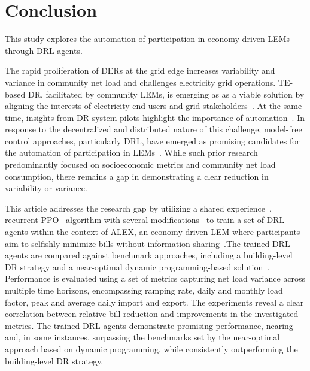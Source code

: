 \documentclass[preprint, 12pt]{elsarticle}
\begin{document}
\section{Conclusion}\label{sec: Conclusion}
This study explores the automation of participation in economy-driven LEMs through DRL agents.

The rapid proliferation of DERs at the grid edge increases variability and variance in community net load and challenges electricity grid operations. TE-based DR, facilitated by community LEMs, is emerging as as a viable solution by aligning the interests of electricity end-users and grid stakeholders~\cite{Mengelkamp2019Review, CAPPER_LEM_Review, Dudjak_LEM_Review}. At the same time, insights from DR system pilots highlight the importance of automation~\cite{FedEnergyRegulatoryCommission_DRReport, CHEN2017}.
%
In response to the decentralized and distributed nature of this challenge, model-free control approaches, particularly DRL, have emerged as promising candidates for the automation of participation in LEMs~\cite{Xu_LEM_Article, Zhou_LEM_Article, Zang_LEM_Article, Chen_LEMDRL_Article, Ye_LEM_2, Ye_LEM_1}. While such prior research predominantly focused on socioeconomic metrics and community net load consumption, there remains a gap in demonstrating a clear reduction in variability or variance.

This article addresses the research gap by utilizing a shared experience~\cite{SharedExperienceAC}, recurrent PPO~\cite{SB3} algorithm with several modifications~\cite{Ilyas_LookAtDRL_PG, Kapturowski_R2D2, HiddenStateRecalc} to train a set of DRL agents within the context of ALEX, an economy-driven LEM where participants aim to selfishly minimize bills without information sharing~\cite{ALEXV1}.The trained DRL agents are compared against benchmark approaches, including a building-level DR strategy and a near-optimal dynamic programming-based solution~\cite{ALEXV2}. Performance is evaluated using a set of metrics capturing net load variance across multiple time horizons, encompassing ramping rate, daily and monthly load factor, peak and average daily import and export. The experiments reveal a clear correlation between relative bill reduction and improvements in the investigated metrics. The trained DRL agents demonstrate promising performance, nearing and, in some instances, surpassing the benchmarks set by the near-optimal approach based on dynamic programming, while consistently outperforming the building-level DR strategy.
\end{document}
